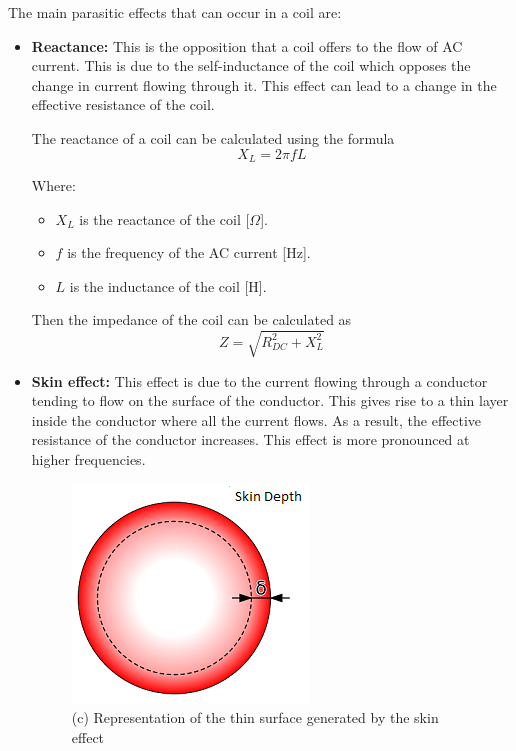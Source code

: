 The main parasitic effects that can occur in a coil are:
\begin{itemize}
    \item \textbf{Reactance:} This is the opposition that a coil offers to the flow of AC current. This is due to the self-inductance of the coil which opposes the change in current flowing through it. This effect can lead to a change in the effective resistance of the coil.
    
    The reactance of a coil can be calculated using the formula
    \begin{equation}
        X_L = 2 \pi f L
    \end{equation}
        
    Where:
    \begin{itemize}
        \item \( X_L \) is the reactance of the coil [\(\Omega\)].
        \item \( f \) is the frequency of the AC current [Hz].
        \item \( L \) is the inductance of the coil [H].
    \end{itemize}

    Then the impedance of the coil can be calculated as
    \begin{equation}
        Z = \sqrt{R_{DC}^2 + X_L^2}
    \end{equation}


    \item \textbf{Skin effect:} This effect is due to the current flowing through a conductor tending to flow on the surface of the conductor. This gives rise to a thin layer inside the conductor where all the current flows. As a result, the effective resistance of the conductor increases. This effect is more pronounced at higher frequencies.
    
    \begin{figure}[th]
        \centering
        \includegraphics[scale=0.4]{Chapters/Chapter2/Flexible_PCB_coils/Figures/skin_depth.png} %
        \caption[Skin depth]{(c) Representation of the thin surface generated by the skin effect}
        \label{fig: Skin depth}
    \end{figure}


\end{itemize}
